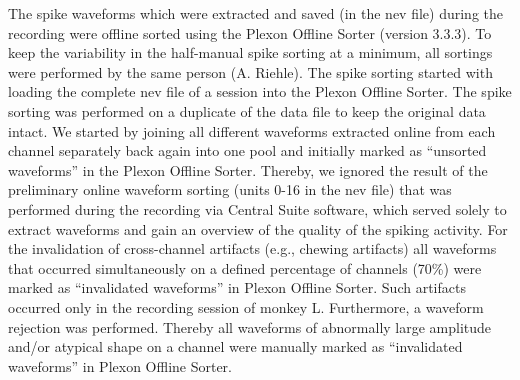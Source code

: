 The spike waveforms which were extracted and saved (in the nev file) during the recording were offline sorted using the Plexon Offline Sorter (version 3.3.3). To keep the variability in the half-manual spike sorting at a minimum, all sortings were performed by the same person (A. Riehle). The spike sorting started with loading the complete nev file of a session into the Plexon Offline Sorter. The spike sorting was performed on a duplicate of the data file to keep the original data intact. We started by joining all different waveforms extracted online from each channel separately back again into one pool and initially marked as “unsorted waveforms” in the Plexon Offline Sorter. Thereby, we ignored the result of the preliminary online waveform sorting (units 0-16 in the nev file) that was performed during the recording via Central Suite software, which served solely to extract waveforms and gain an overview of the quality of the spiking activity. For the invalidation of cross-channel artifacts (e.g., chewing artifacts) all waveforms that occurred simultaneously on a defined percentage of channels (70\%) were marked as “invalidated waveforms” in Plexon Offline Sorter. Such artifacts occurred only in the recording session of monkey L. Furthermore, a waveform rejection was performed. Thereby all waveforms of abnormally large amplitude and/or atypical shape on a channel were manually marked as “invalidated waveforms” in Plexon Offline Sorter.

